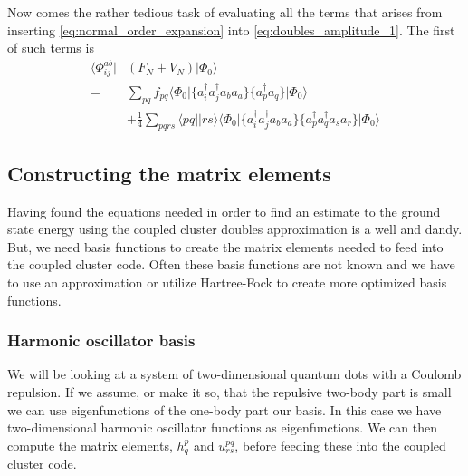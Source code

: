 \documentclass[
    a4paper, aps, twocolumn, floatfix, superscriptaddress,
    nofootinbib]{revtex4-1}
\newcommand{\1}{\mathds{1}}
\newcommand{\bra}[1]{\langle #1\lvert}
\newcommand{\ket}[1]{\rvert #1\rangle}
\begin{document}
		Now comes the rather tedious task of evaluating all the terms 
		that arises from inserting \autoref{eq:normal_order_expansion}
		into \autoref{eq:doubles_amplitude_1}. The first of such terms
		is
		\begin{equation}
		\begin{aligned}
			\bra{\Phi_{ij}^{ab}} &(F_N + V_N)\ket{\Phi_0} \\
			 =& \sum_{pq}f_{pq}\bra{\Phi_0}\{a_i^\dagger a_j^\dagger a_ba_a\}\{a^\dagger_pa_q\}\ket{\Phi_0} \\
			 &+\frac{1}{4}\sum_{pqrs}\bra{pq}\ket{rs}
			 \bra{\Phi_0}\{a_i^\dagger a_j^\dagger a_ba_a\}\{a^\dagger_pa^\dagger_qa_sa_r\}\ket{\Phi_0}
		\end{aligned}
		\end{equation}
		
    \subsection{Constructing the matrix elements}
        Having found the equations needed in order to find an estimate to the
        ground state energy using the coupled cluster doubles approximation is a
        well and dandy. But, we need basis functions to create the matrix
        elements needed to feed into the coupled cluster code.  Often these
        basis functions are not known and we have to use an approximation or
        utilize Hartree-Fock to create more optimized basis functions.

        \subsubsection{Harmonic oscillator basis}
            We will be looking at a system of two-dimensional quantum dots with
            a Coulomb repulsion.  If we assume, or make it so, that the
            repulsive two-body part is small we can use eigenfunctions of the
            one-body part our basis. In this case we have two-dimensional
            harmonic oscillator functions as eigenfunctions. We can then compute
            the matrix elements, $h_q^p$ and $u_{rs}^{pq}$, before feeding these
            into the coupled cluster code.
\end{document}
